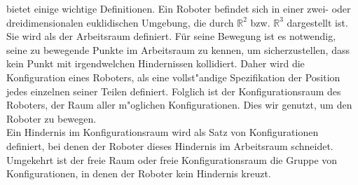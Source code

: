 %
%
%
\cite{Principles:05} bietet einige wichtige Definitionen. Ein Roboter befindet sich in einer zwei- oder dreidimensionalen euklidischen Umgebung, die durch $\mathbb{R}^{2}$ bzw. $\mathbb{R}^{3}$ dargestellt ist. Sie wird als der Arbeitsraum definiert. Für seine Bewegung ist es notwendig, seine zu bewegende Punkte im Arbeitsraum zu kennen, um sicherzustellen, dass kein Punkt mit irgendwelchen Hindernissen kollidiert. Daher wird die Konfiguration eines Roboters, als eine vollst"andige Spezifikation der Position jedes einzelnen seiner Teilen definiert. Folglich ist der Konfigurationsraum des Roboters, der Raum aller  m"oglichen Konfigurationen. Dies wir genutzt, um den Roboter zu bewegen.\\
Ein Hindernis im Konfigurationsraum wird als Satz von Konfigurationen definiert, bei denen der Roboter dieses Hindernis im Arbeitsraum schneidet. Umgekehrt ist der freie Raum oder freie Konfigurationsraum die Gruppe von Konfigurationen, in denen der Roboter kein Hindernis kreuzt.



